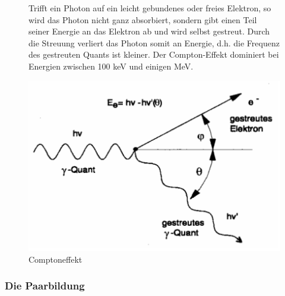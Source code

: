 \begin{figure}[H]
	\begin{minipage}{0.4\textwidth}
	Trifft ein Photon auf ein leicht gebundenes oder freies Elektron, so wird das Photon nicht ganz absorbiert, sondern gibt einen Teil seiner Energie an das Elektron ab und wird selbst gestreut. Durch die Streuung verliert das Photon somit an Energie, d.h. die Frequenz des gestreuten Quants ist kleiner. Der Compton-Effekt dominiert bei Energien zwischen 100 keV und einigen MeV.
	\end{minipage}
	\begin{minipage}{0.59\textwidth}
	\centering \includegraphics[width=\textwidth]{Bilder/Comptoneffekt.png}
	\caption{Comptoneffekt}
	\end{minipage}

\end{figure}

\subsubsection{Die Paarbildung}

